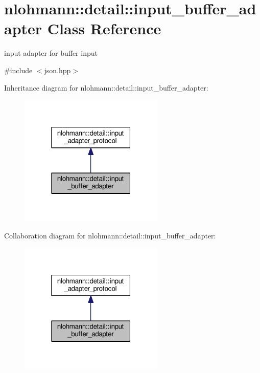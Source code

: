 \hypertarget{classnlohmann_1_1detail_1_1input__buffer__adapter}{}\section{nlohmann\+:\+:detail\+:\+:input\+\_\+buffer\+\_\+adapter Class Reference}
\label{classnlohmann_1_1detail_1_1input__buffer__adapter}


input adapter for buffer input  




{\ttfamily \#include $<$json.\+hpp$>$}



Inheritance diagram for nlohmann\+:\+:detail\+:\+:input\+\_\+buffer\+\_\+adapter\+:\nopagebreak
\begin{figure}[H]
\begin{center}
\leavevmode
\includegraphics[width=195pt]{classnlohmann_1_1detail_1_1input__buffer__adapter__inherit__graph}
\end{center}
\end{figure}


Collaboration diagram for nlohmann\+:\+:detail\+:\+:input\+\_\+buffer\+\_\+adapter\+:\nopagebreak
\begin{figure}[H]
\begin{center}
\leavevmode
\includegraphics[width=195pt]{classnlohmann_1_1detail_1_1input__buffer__adapter__coll__graph}
\end{center}
\end{figure}
